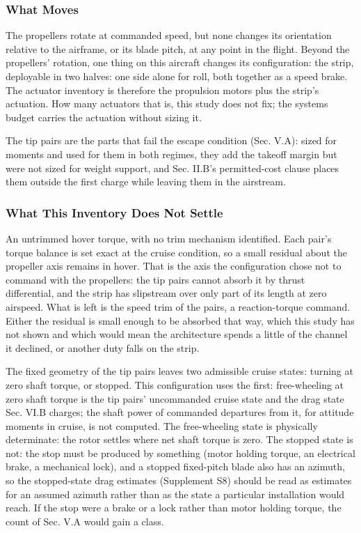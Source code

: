 \documentclass[journal]{new-aiaa}
\begin{document}
\subsubsection{What Moves}

The propellers rotate at commanded speed, but none changes its orientation relative to the airframe, or its blade pitch, at any point in the flight. Beyond the propellers' rotation, one thing on this aircraft changes its configuration: the strip, deployable in two halves: one side alone for roll, both together as a speed brake. The actuator inventory is therefore the propulsion motors plus the strip's actuation. How many actuators that is, this study does not fix; the systems budget carries the actuation without sizing it.

The tip pairs are the parts that fail the escape condition (Sec. V.A): sized for moments and used for them in both regimes, they add the takeoff margin but were not sized for weight support, and Sec. II.B's permitted-cost clause places them outside the first charge while leaving them in the airstream.

\subsubsection{What This Inventory Does Not Settle}

An untrimmed hover torque, with no trim mechanism identified. Each pair's torque balance is set exact at the cruise condition, so a small residual about the propeller axis remains in hover. That is the axis the configuration chose not to command with the propellers: the tip pairs cannot absorb it by thrust differential, and the strip has slipstream over only part of its length at zero airspeed. What is left is the speed trim of the pairs, a reaction-torque command. Either the residual is small enough to be absorbed that way, which this study has not shown and which would mean the architecture spends a little of the channel it declined, or another duty falls on the strip.

The fixed geometry of the tip pairs leaves two admissible cruise states: turning at zero shaft torque, or stopped. This configuration uses the first: free-wheeling at zero shaft torque is the tip pairs' uncommanded cruise state and the drag state Sec. VI.B charges; the shaft power of commanded departures from it, for attitude moments in cruise, is not computed. The free-wheeling state is physically determinate: the rotor settles where net shaft torque is zero. The stopped state is not: the stop must be produced by something (motor holding torque, an electrical brake, a mechanical lock), and a stopped fixed-pitch blade also has an azimuth, so the stopped-state drag estimates (Supplement S8) should be read as estimates for an assumed azimuth rather than as the state a particular installation would reach. If the stop were a brake or a lock rather than motor holding torque, the count of Sec. V.A would gain a class.
\end{document}
